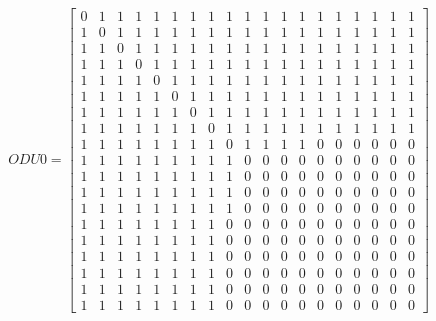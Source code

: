 \[
ODU0=
  \begin{bmatrix}
    0 & 1 & 1 & 1 & 1 & 1 & 1 & 1 & 1 & 1 & 1 & 1 & 1 & 1 & 1 & 1 & 1 & 1 & 1 \\
    1 & 0 & 1 & 1 & 1 & 1 & 1 & 1 & 1 & 1 & 1 & 1 & 1 & 1 & 1 & 1 & 1 & 1 & 1 \\
    1 & 1 & 0 & 1 & 1 & 1 & 1 & 1 & 1 & 1 & 1 & 1 & 1 & 1 & 1 & 1 & 1 & 1 & 1 \\
    1 & 1 & 1 & 0 & 1 & 1 & 1 & 1 & 1 & 1 & 1 & 1 & 1 & 1 & 1 & 1 & 1 & 1 & 1 \\
    1 & 1 & 1 & 1 & 0 & 1 & 1 & 1 & 1 & 1 & 1 & 1 & 1 & 1 & 1 & 1 & 1 & 1 & 1 \\
    1 & 1 & 1 & 1 & 1 & 0 & 1 & 1 & 1 & 1 & 1 & 1 & 1 & 1 & 1 & 1 & 1 & 1 & 1 \\
    1 & 1 & 1 & 1 & 1 & 1 & 0 & 1 & 1 & 1 & 1 & 1 & 1 & 1 & 1 & 1 & 1 & 1 & 1 \\
    1 & 1 & 1 & 1 & 1 & 1 & 1 & 0 & 1 & 1 & 1 & 1 & 1 & 1 & 1 & 1 & 1 & 1 & 1 \\
    1 & 1 & 1 & 1 & 1 & 1 & 1 & 1 & 0 & 1 & 1 & 1 & 1 & 0 & 0 & 0 & 0 & 0 & 0 \\
    1 & 1 & 1 & 1 & 1 & 1 & 1 & 1 & 1 & 0 & 0 & 0 & 0 & 0 & 0 & 0 & 0 & 0 & 0 \\
    1 & 1 & 1 & 1 & 1 & 1 & 1 & 1 & 1 & 0 & 0 & 0 & 0 & 0 & 0 & 0 & 0 & 0 & 0 \\
    1 & 1 & 1 & 1 & 1 & 1 & 1 & 1 & 1 & 0 & 0 & 0 & 0 & 0 & 0 & 0 & 0 & 0 & 0 \\
    1 & 1 & 1 & 1 & 1 & 1 & 1 & 1 & 1 & 0 & 0 & 0 & 0 & 0 & 0 & 0 & 0 & 0 & 0 \\
    1 & 1 & 1 & 1 & 1 & 1 & 1 & 1 & 0 & 0 & 0 & 0 & 0 & 0 & 0 & 0 & 0 & 0 & 0 \\
    1 & 1 & 1 & 1 & 1 & 1 & 1 & 1 & 0 & 0 & 0 & 0 & 0 & 0 & 0 & 0 & 0 & 0 & 0 \\
    1 & 1 & 1 & 1 & 1 & 1 & 1 & 1 & 0 & 0 & 0 & 0 & 0 & 0 & 0 & 0 & 0 & 0 & 0 \\
    1 & 1 & 1 & 1 & 1 & 1 & 1 & 1 & 0 & 0 & 0 & 0 & 0 & 0 & 0 & 0 & 0 & 0 & 0 \\
    1 & 1 & 1 & 1 & 1 & 1 & 1 & 1 & 0 & 0 & 0 & 0 & 0 & 0 & 0 & 0 & 0 & 0 & 0 \\
    1 & 1 & 1 & 1 & 1 & 1 & 1 & 1 & 0 & 0 & 0 & 0 & 0 & 0 & 0 & 0 & 0 & 0 & 0
  \end{bmatrix}
\]

\vspace{15pt}

